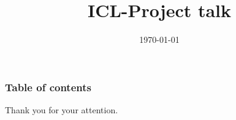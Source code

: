 \documentclass{beamer}
\begin{document}
\title{ICL-Project talk}
\date{\today}

\begin{frame}
  \titlepage
\end{frame}

\begin{frame}
  \frametitle{Table of contents}
  \tableofcontents[hideallsubsections]
\end{frame}


\begin{frame}
\begin{center}
\LARGE
  Thank you for your attention.
\end{center}
\end{frame}
\end{document}
